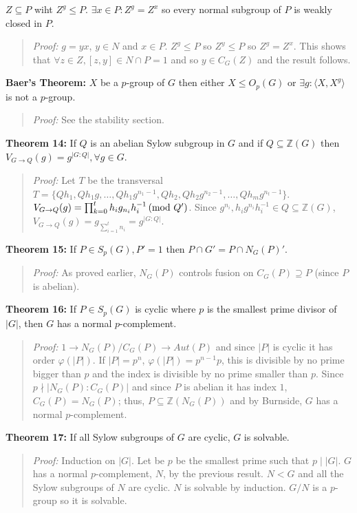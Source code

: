 $Z \subseteq P$ wiht $Z^g \leq P$. $\exists x \in P: Z^g = Z^x$ so every normal subgroup of $P$ is weakly
closed in $P$.
\begin{quote}
\emph{Proof:} 
$g=yx$, $y \in N$ and $x \in P$.
$Z^g \leq P$ so $Z^y \leq P$ so $Z^g = Z^x$.
This shows that $\forall z \in Z, [z,y] \in N \cap P = 1$ and so
$y \in C_G(Z)$ and the result follows.
\end{quote}
{\bf Baer's Theorem:}
$X$ be a $p$-group of $G$ then either
$X \le O_p(G)$ or $\exists g: \langle X, X^g \rangle $ is not a $p$-group.
\begin{quote}
\emph{Proof:}  
See the stability section.
\end{quote}
{\bf Theorem 14:} If $Q$ is an abelian Sylow subgroup in $G$ and if $Q \subseteq {\mathbb Z}(G)$ then
$V_{G \rightarrow Q}(g)= g^{|G:Q|}, \forall g \in G$.  
\begin{quote}
\emph{Proof:}  
Let $T$ be the transversal 
$T= \{ Qh_1, Qh_1g, \ldots , Qh_1g^{n_1-1}, Qh_2, Qh_2 g^{n_2-1}, \ldots, Qh_m g^{n_t-1} \}$. 
$V_{G \rightarrow Q}(g)= \prod_{k=0}^t h_i g_{n_i} h_i^{-1} \thinspace \textnormal{(mod } Q' \textnormal{)}$.  Since 
$g^{n_i}, h_i g^{n_i} h_i^{-1} \in Q \subseteq {\mathbb Z}(G)$, 
$V_{G \rightarrow Q}(g)= g_{\sum_{i=1}^t n_i} = g^{|G:Q|}$. 
\end{quote}
{\bf Theorem 15:}
If $P \in S_p (G), P'=1$ then $P \cap G' = P \cap N_G(P)'$.
\begin{quote}
\emph{Proof:}  
As proved earlier, $N_G(P)$ controls fusion on $C_G(P) \supseteq P$ (since $P$ is abelian).
\end{quote}
{\bf Theorem 16:} If $P \in S_p(G)$ is cyclic where $p$ is the smallest prime divisor of $|G|$,
then $G$ has a normal $p$-complement.
\begin{quote}
\emph{Proof:}  
$1 \rightarrow N_G(P)/C_G(P) \rightarrow Aut(P)$ and since $|P|$ is cyclic it has order
$\varphi(|P|)$.  If $|P|= p^n$, $\varphi(|P|)= p^{n-1}p$, this is divisible by no prime
bigger than $p$ and the index is divisible by no prime smaller than $p$.  
Since $p \nmid |N_G(P):C_G(P)|$ and since $P$ is abelian it has index $1$, $C_G(P)= N_G(P)$;
thus, $P \subseteq  {\mathbb Z}(N_G(P))$ and by Burnside, $G$ has a normal $p$-complement.
\end{quote}
{\bf Theorem 17:}
If all Sylow subgroups of $G$ are cyclic, $G$ is solvable.  
\begin{quote}
\emph{Proof:}  
Induction on $|G|$.  Let be $p$ be the smallest prime such that $p \mid |G|$.
$G$ has a normal $p$-complement, $N$, by the previous result.  $N < G$ and all the
Sylow subgroups of $N$ are cyclic.  $N$ is solvable by induction. $G/N$ is a $p$-group
so it is solvable.
\end{quote}
